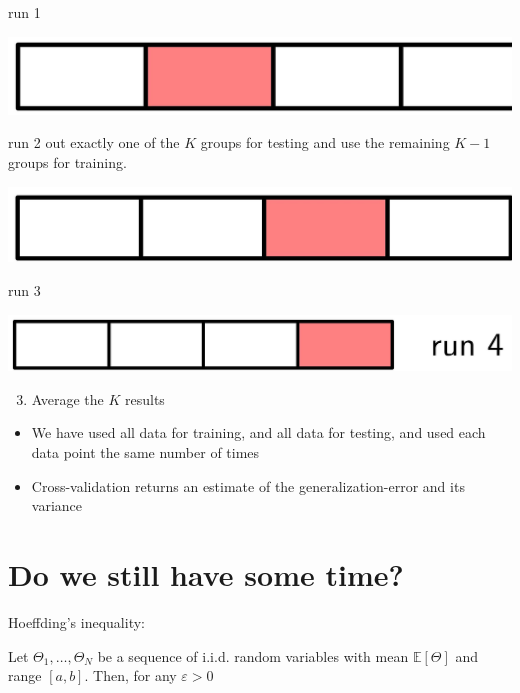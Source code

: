 \documentclass[10pt]{article}
\begin{document}
run 1

\begin{center}
\includegraphics[max width=\textwidth]{2023_12_30_b4c98a1755bce7fa9493g-24(1)}
\end{center}

run 2 out exactly one of the $K$ groups for testing and use the remaining $K-1$ groups for training.

\begin{center}
\includegraphics[max width=\textwidth]{2023_12_30_b4c98a1755bce7fa9493g-24(3)}
\end{center}

run 3

\begin{center}
\includegraphics[max width=\textwidth]{2023_12_30_b4c98a1755bce7fa9493g-24(2)}
\end{center}

\begin{enumerate}
  \setcounter{enumi}{2}
  \item Average the $K$ results
\end{enumerate}

\begin{itemize}
  \item We have used all data for training, and all data for testing, and used each data point the same number of times
  \item Cross-validation returns an estimate of the generalization-error and its variance
\end{itemize}

\section*{Do we still have some time?}
Hoeffding's inequality:

Let $\Theta_{1}, \ldots, \Theta_{N}$ be a sequence of i.i.d. random variables with mean $\mathbb{E}[\Theta]$ and range $[a, b]$. Then, for any $\varepsilon>0$
\end{document}
